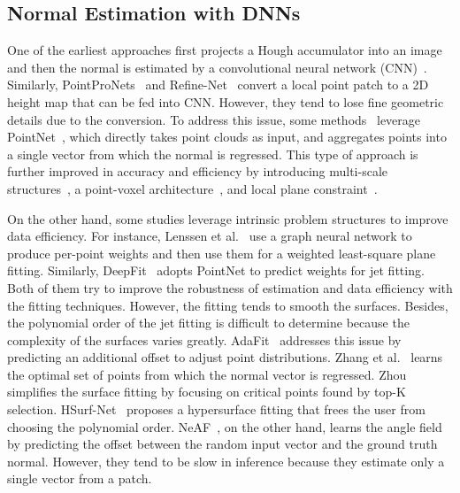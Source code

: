 \documentclass[sigconf]{acmart}
\begin{document}
\subsection{Normal Estimation with DNNs}
One of the earliest approaches first projects a Hough accumulator into an image and then the normal is estimated by a convolutional neural network (CNN)~\cite{boulch2016deep}. Similarly, PointProNets~\cite{roveri2018pointpronets} and Refine-Net~\cite{zhou2022refine} convert a local point patch to a 2D height map that can be fed into CNN. 
However, they tend to lose fine geometric details due to the conversion.
To address this issue, some methods~\cite{guerrero2018pcpnet,sharma2021point} leverage PointNet~\cite{qi2017pointnet}, which directly takes point clouds as input, and aggregates points into a single vector from which the normal is regressed.
This type of approach is further improved in accuracy and efficiency by introducing multi-scale structures~\cite{guerrero2018pcpnet}, a point-voxel architecture~\cite{hashimoto2019normal}, and local plane constraint~\cite{zhou2020normal}. 


On the other hand, some studies leverage intrinsic problem structures to improve data efficiency. For instance, Lenssen et al.~\cite{lenssen2020deep} use a graph neural network to produce per-point weights and then use them for a weighted least-square plane fitting. Similarly, DeepFit~\cite{ben2020deepfit} adopts PointNet to predict weights for jet fitting. 
Both of them try to improve the robustness of estimation and data efficiency with the fitting techniques.
However, the fitting tends to smooth the surfaces. Besides, the polynomial order of the jet fitting is difficult to determine because the complexity of the surfaces varies greatly.
AdaFit~\cite{zhu2021adafit} addresses this issue by predicting an additional offset to adjust point distributions.
Zhang et al.~\cite{zhang2022geometry} learns the optimal set of points from which the normal vector is regressed.
Zhou~\etal~\cite{zhou2023improvement} simplifies the surface fitting by focusing on critical points found by top-K selection.
HSurf-Net~\cite{li2022hsurf} proposes a hypersurface fitting that frees the user from choosing the polynomial order. NeAF~\cite{li2023NeAF}, on the other hand, learns the angle field by predicting the offset between the random input vector and the ground truth normal.          
However, they tend to be slow in inference because they estimate only a single vector from a patch.
\end{document}

